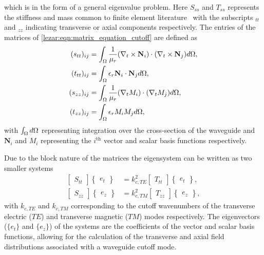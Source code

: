 which is in the form of a general eigenvalue problem.  Here $S_{ss}$ and $T_{ss}$ represents the stiffness and
mass common to finite element literature~\cite{Davidson2005, Jin2002} with
the subscripts $_{tt}$ and $_{zz}$ indicating transverse or axial
components respectively.  The entries of the matrices of
\eqref{lezar:eqn:matrix_equation_cutoff} are defined as
\begin{align}
\label{lezar:eqn:s_tt_ij}
(s_{tt})_{ij} &= \intoverdomain{\frac{1}{\mu_r}(\curl{\mathbf{N}_i}{t})\cdot(\curl{\mathbf{N}_j}{t})}{\Omega},\\
\label{lezar:eqn:t_tt_ij}
(t_{tt})_{ij} &= \intoverdomain{\epsilon_r\mathbf{N}_i\cdot\mathbf{N}_j}{\Omega},\\
\label{lezar:eqn:s_zz_ij}
(s_{zz})_{ij} &= \intoverdomain{\frac{1}{\mu_r}(\nabla_t{M_i})\cdot(\nabla_t{M_j})}{\Omega},\\
\label{lezar:eqn:t_zz_ij}
(t_{zz})_{ij} &= \intoverdomain{\epsilon_r M_i M_j}{\Omega},
\end{align}
with $\int_{\Omega}{}{d\Omega}$ representing integration over the
cross-section of the waveguide and $\mathbf{N}_i$ and $M_i$
representing the $i^{\text{th}}$ vector and scalar basis functions
respectively.

Due to the block nature of the matrices the eigensystem can be written
as two smaller systems
\begin{align}
    \begin{bmatrix}S_{tt}\end{bmatrix}\begin{Bmatrix}e_t\end{Bmatrix} &=
    k_{c,TE}^{2}\begin{bmatrix}
    T_{tt}\end{bmatrix}\begin{Bmatrix}e_t\end{Bmatrix},\\
    \begin{bmatrix}S_{zz}\end{bmatrix}\begin{Bmatrix}e_z\end{Bmatrix} &= k_{c,TM}^{2}\begin{bmatrix}T_{zz}\end{bmatrix}\begin{Bmatrix}e_z\end{Bmatrix},
\end{align}
with $k_{c,TE}$ and $k_{c,TM}$ corresponding to the cutoff
wavenumbers of the transverse electric ($TE$)
and transverse magnetic ($TM$) modes respectively. The eigenvectors
($\{e_t\}$ and $\{e_z\}$) of the systems are the coefficients of the
vector and scalar basis functions, allowing for the calculation of the
transverse and axial field distributions associated with a waveguide
cutoff mode.

